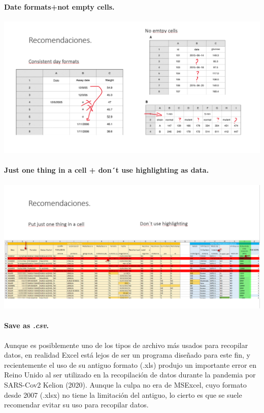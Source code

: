 \documentclass[
  letterpaper,
  DIV=11,
  numbers=noendperiod]{scrreprt}
\let\oldparagraph\paragraph
\renewcommand{\paragraph}[1]{\oldparagraph{#1}\mbox{}}
\begin{document}
\hypertarget{date-formatsnot-empty-cells.}{%
\paragraph{Date formats+not empty
cells.}\label{date-formatsnot-empty-cells.}}

\includegraphics{./pics/Recom2.png}

\hypertarget{just-one-thing-in-a-cell-dont-use-highlighting-as-data.}{%
\paragraph{Just one thing in a cell + don´t use highlighting as
data.}\label{just-one-thing-in-a-cell-dont-use-highlighting-as-data.}}

\includegraphics{./pics/Recom3.png}

\hypertarget{save-as-.csv.}{%
\paragraph{\texorpdfstring{Save as
\emph{.csv}.}{Save as .csv.}}\label{save-as-.csv.}}

Aunque es posiblemente uno de los tipos de archivo más usados para
recopilar datos, en realidad Excel está lejos de ser un programa
diseñado para este fin, y recientemente el uso de su antiguo formato
(.xls) produjo un importante error en Reino Unido al ser utilizado en la
recopilación de datos durante la pandemia por SARS-Cov2 Kelion (2020).
Aunque la culpa no era de MSExcel, cuyo formato desde 2007 (.xlsx) no
tiene la limitación del antiguo, lo cierto es que se suele recomendar
evitar su uso para recopilar datos.
\end{document}
